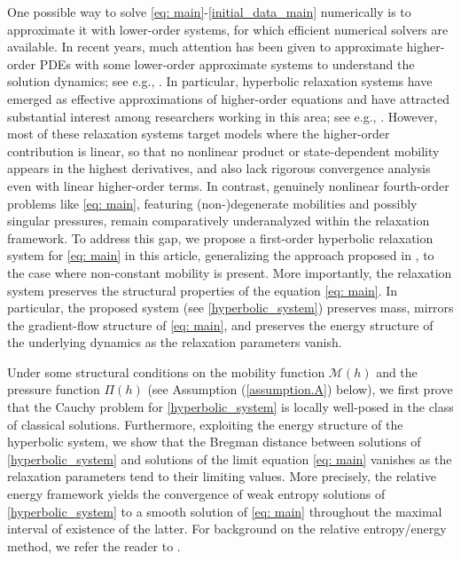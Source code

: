 \documentclass[11pt]{article}
\numberwithin{equation}{section}
\newtheorem{counter example}[theorem]{Counter Example}
\numberwithin{equation}{section}
\numberwithin{equation}{section}
\begin{document}
One possible way to solve \eqref{eq: main}-\eqref{initial_data_main} numerically is to approximate it with lower-order systems, for which efficient numerical solvers are available. In recent years, much attention has been given to approximate higher-order PDEs with some lower-order approximate systems to understand the solution dynamics; see e.g., \cite{corli2014parabolic, corli2012singular}. In particular, hyperbolic relaxation systems have emerged as effective approximations of higher-order equations and have attracted substantial interest among researchers working in this area; see e.g., \cite{biswas2025traveling, dhaouadi2025first, giesselmann2025convergence, GKLR26, giesselmann2026justification}. However, most of these relaxation systems target models where the higher-order contribution is linear, so that no nonlinear product or state-dependent mobility appears in the highest derivatives, and also lack rigorous convergence analysis even with linear higher-order terms. In contrast, genuinely nonlinear fourth-order problems like \eqref{eq: main}, featuring (non-)degenerate mobilities and possibly singular pressures, remain comparatively underanalyzed within the relaxation framework. To address this gap, we propose a first-order hyperbolic relaxation system for \eqref{eq: main} in this article, generalizing the approach proposed in \cite{dhaouadi2025first}, to the case where non-constant mobility is present. More importantly, the relaxation system preserves the structural properties of the equation \eqref{eq: main}. In particular, the proposed system (see \eqref{hyperbolic_system}) preserves mass, mirrors the gradient-flow structure of \eqref{eq: main}, and preserves the energy structure of the underlying dynamics as the relaxation parameters vanish.
\medskip

Under some structural conditions on the mobility function $\mathcal{M}(h)$ and the pressure function $\Pi(h)$ (see Assumption (\ref{assumption.A}) below), we first prove that the Cauchy problem for \eqref{hyperbolic_system} is locally well-posed in the class of classical solutions. Furthermore, exploiting the energy structure of the hyperbolic system, we show that the Bregman distance between solutions of \eqref{hyperbolic_system} and solutions of the limit equation \eqref{eq: main} vanishes as the relaxation parameters tend to their limiting values. More precisely, the relative energy framework yields the convergence of weak entropy solutions of \eqref{hyperbolic_system} to a smooth solution of \eqref{eq: main} throughout the maximal interval of existence of the latter. For background on the relative entropy/energy method, we refer the reader to \cite{dafermos2005hyperbolic}.
\end{document}
